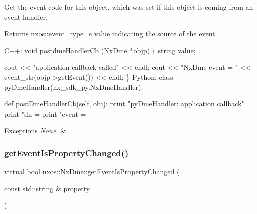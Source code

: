 Get the event code for this object, which was set if this object is coming from an event handler.

\begin{DoxyReturn}{Returns}
\mbox{\hyperlink{namespacenxos_af9a9040b7681199d386e94eb888018cb}{nxos\+::event\+\_\+type\+\_\+e}} value indicating the source of the event 
\begin{DoxyCode}
C++:
   \textcolor{keywordtype}{void} postdmeHandlerCb (NxDme *objp)
   \{
       \textcolor{keywordtype}{string} value;

       cout << \textcolor{stringliteral}{"application callback called"} << endl;
       cout << \textcolor{stringliteral}{"NxDme event = "} << event\_str(objp->getEvent()) << endl;
   \}
Python:
   \textcolor{keyword}{class }pyDmeHandler(nx\_sdk\_py.NxDmeHandler):

       def postDmeHandlerCb(self, obj):
           print "pyDmeHandler: application callback"
           print "dn = %
           print "event = %
\end{DoxyCode}

\end{DoxyReturn}

\begin{DoxyExceptions}{Exceptions}
{\em None.} & \\
\hline
\end{DoxyExceptions}
\mbox{\label{classnxos_1_1_nx_dme_a6f7052ff8ef29df2f692dbfdb3a8c987}} 
\subsubsection{\texorpdfstring{get\+Event\+Is\+Property\+Changed()}{getEventIsPropertyChanged()}}
{\footnotesize\ttfamily virtual bool nxos\+::\+Nx\+Dme\+::get\+Event\+Is\+Property\+Changed (\begin{DoxyParamCaption}\item[{const std\+::string \&}]{property }\end{DoxyParamCaption})\hspace{0.3cm}{\ttfamily [pure virtual]}}

